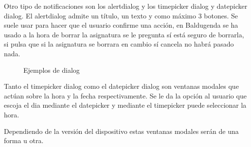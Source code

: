 Otro tipo de notificaciones son los alertdialog y los timepicker dialog y datepicker dialog.
El alertdialog admite un título, un texto y como máximo 3 botones. Se suele usar para hacer que el usuario confirme una acción, en Baldugenda se ha usado a la hora de borrar la asignatura se le pregunta sí está seguro de borrarla, si pulsa que si la asignatura se borrara en cambio sí cancela no habrá pasado nada.
\newpage
\begin{figure}[H] 
  \begin{center} 
    \caption{Ejemplos de dialog} 
    \label{fig:EjemplosDialog} 
  \end{center} 
\end{figure}

Tanto el timepicker dialog como el datepicker dialog son ventanas modales que actúan sobre la hora y la fecha respectivamente.
Se le da la opción al usuario que escoja el dia mediante el datepicker y mediante el timepicker puede seleccionar la hora.

Dependiendo de la versión del dispositivo estas ventanas modales serán de una forma u otra.

